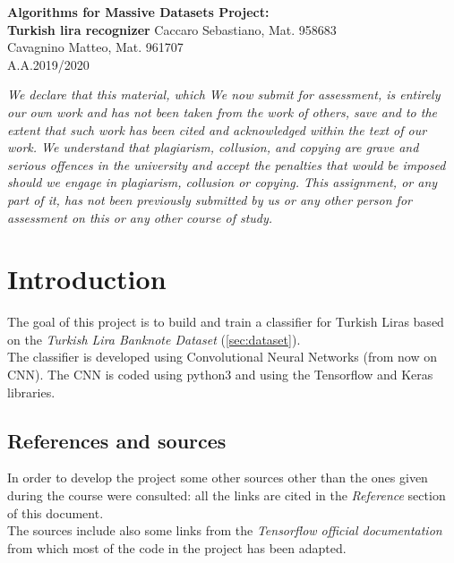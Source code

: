 \documentclass[a4paper,12pt]{article}
\begin{document}
\begin{titlepage}
\begin{center}
	\Large{\textbf{Algorithms for Massive Datasets Project:\\Turkish lira recognizer}}
\vfill
\normalsize{Caccaro Sebastiano, Mat. 958683}\\
\normalsize{Cavagnino Matteo, Mat. 961707}\\
\normalsize{A.A.2019/2020}
\end{center}
\end{titlepage}

\vspace*{\fill}
\textit{We declare that this material, which We now submit for assessment, is entirely our own work and has not been taken from the work of others, save and to the extent that such work has been cited and acknowledged within the text of our work. We understand that plagiarism, collusion, and copying are grave and serious offences in the university and accept the penalties that would be imposed should we engage in plagiarism, collusion or copying. This assignment, or any part of it, has not been previously submitted by us or any other person for assessment on this or any other course of study.}
\vspace*{\fill}

\newpage

\tableofcontents

\clearpage


\newpage
\section{Introduction}

The goal of this project is to build and train a classifier for Turkish Liras based on the \textit{Turkish Lira Banknote Dataset} (\autoref{sec:dataset}).\\
The classifier is developed using Convolutional Neural Networks (from now on CNN). The CNN is coded using python3 and using the Tensorflow and Keras libraries.

\subsection{References and sources}
In order to develop the project some other sources other than the ones given during the course were consulted: all the links are cited in the \textit{Reference} section of this document.\\
The sources include also some links from the \textit{Tensorflow official documentation} from which most of the code in the project has been adapted.
\end{document}

